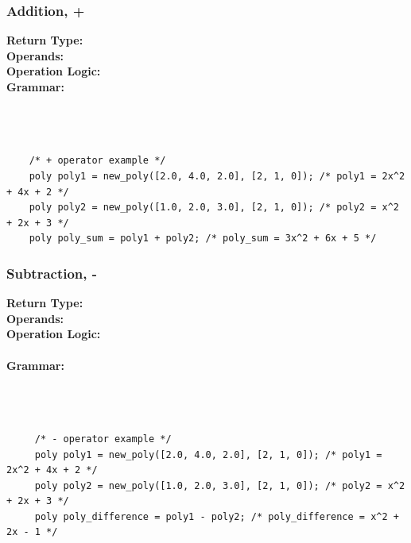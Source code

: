 \documentclass{article}
\begin{document}
    \subsubsection{Addition, +}
    \textbf{Return Type:}\\
    \textbf{Operands:}\\
    \textbf{Operation Logic:}\\
    \textbf{Grammar:}\\
    \\
    \\
    \\
    \begin{lstlisting}
    /* + operator example */
    poly poly1 = new_poly([2.0, 4.0, 2.0], [2, 1, 0]); /* poly1 = 2x^2 + 4x + 2 */
    poly poly2 = new_poly([1.0, 2.0, 3.0], [2, 1, 0]); /* poly2 = x^2 + 2x + 3 */
    poly poly_sum = poly1 + poly2; /* poly_sum = 3x^2 + 6x + 5 */
    \end{lstlisting}
    
    \subsubsection{Subtraction, -}
    \textbf{Return Type:}\\
     \textbf{Operands:}\\
     \textbf{Operation Logic:}\\
    \\
    \textbf{Grammar:}\\
    \\
    \\
    \\
     \begin{lstlisting}
     /* - operator example */
     poly poly1 = new_poly([2.0, 4.0, 2.0], [2, 1, 0]); /* poly1 = 2x^2 + 4x + 2 */
     poly poly2 = new_poly([1.0, 2.0, 3.0], [2, 1, 0]); /* poly2 = x^2 + 2x + 3 */
     poly poly_difference = poly1 - poly2; /* poly_difference = x^2 + 2x - 1 */
    \end{lstlisting}
\end{document}
